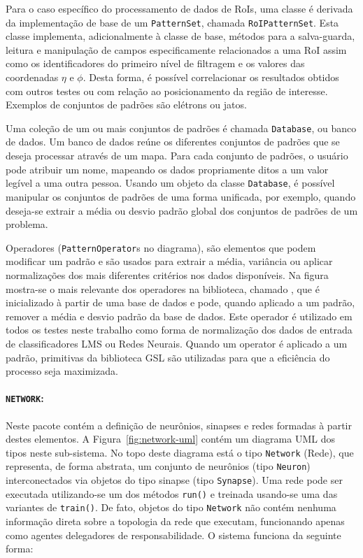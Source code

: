 Para o caso específico do processamento de dados de RoIs, uma classe é
derivada da implementação de base de um \texttt{PatternSet}, chamada
\texttt{RoIPatternSet}. Esta classe implementa, adicionalmente à classe de
base, métodos para a salva-guarda, leitura e manipulação de campos
especificamente relacionados a uma RoI assim como os identificadores do
primeiro nível de filtragem e os valores das coordenadas $\eta$ e $\phi$.
Desta forma, é possível correlacionar os resultados obtidos com outros testes
ou com relação ao posicionamento da região de interesse. Exemplos de conjuntos
de padrões são elétrons ou jatos.

Uma coleção de um ou mais conjuntos de padrões é chamada \texttt{Database}, ou
banco de dados. Um banco de dados reúne os diferentes conjuntos de padrões que
se deseja processar através de um mapa. Para cada conjunto de padrões, o
usuário pode atribuir um nome, mapeando os dados propriamente ditos a um valor
legível a uma outra pessoa. Usando um objeto da classe \texttt{Database}, é
possível manipular os conjuntos de padrões de uma forma unificada, por
exemplo, quando deseja-se extrair a média ou desvio padrão global dos
conjuntos de padrões de um problema.

Operadores (\texttt{PatternOperator}s no diagrama), são elementos que podem
modificar um padrão e são usados para extrair a média, variância ou aplicar
normalizações dos mais diferentes critérios nos dados disponíveis. Na figura
mostra-se o mais relevante dos operadores na biblioteca, chamado
, que é inicializado à partir de uma base de dados
e pode, quando aplicado a um padrão, remover a média e desvio padrão da base
de dados. Este operador é utilizado em todos os testes neste trabalho como
forma de normalização dos dados de entrada de classificadores LMS ou Redes
Neurais. Quando um operator é aplicado a um padrão, primitivas da biblioteca
GSL são utilizadas para que a eficiência do processo seja maximizada.

\paragraph{\texttt{NETWORK}:} Neste pacote contém a definição de
neurônios, sinapses e redes formadas à partir destes elementos. A
Figura~\ref{fig:network-uml} contém um diagrama UML dos tipos neste
sub-sistema. No topo deste diagrama está o tipo \texttt{Network} (Rede), que
representa, de forma abstrata, um conjunto de neurônios (tipo \texttt{Neuron})
interconectados via objetos do tipo sinapse (tipo \texttt{Synapse}). Uma rede
pode ser executada utilizando-se um dos métodos \texttt{run()} e treinada
usando-se uma das variantes de \texttt{train()}. De fato, objetos do tipo
\texttt{Network} não contém nenhuma informação direta sobre a topologia da
rede que executam, funcionando apenas como agentes delegadores de
responsabilidade. O sistema funciona da seguinte forma:

